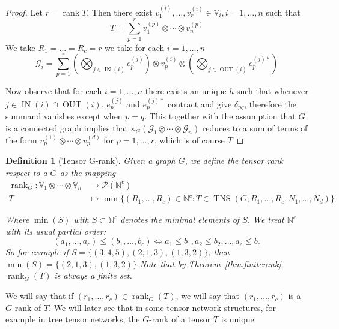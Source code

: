 \documentclass[11pt,a4paper,openright,oneside]{book}
\numberwithin{equation}{section}
\newtheorem{defn0}{Definition}[chapter]
\newenvironment{definition}{ \begin{defn0}}{\end{defn0}}
\newcommand{\thmref}[1]{Theorem~\ref{#1}}
\DeclareMathOperator{\rank}{rank}
\DeclareMathOperator{\IN}{IN}
\DeclareMathOperator{\OUT}{OUT}
\DeclareMathOperator{\TNS}{TNS}
\begin{document}
\begin{proof} Let $r = \rank{T}$. Then there exist $v_1^{(i)}, \dots, v_r^{(i)} \in \mathbb{V}_i, i = 1, \dots, n$ such that
    $$T = \sum_{p=1}^r v_1^{(p)} \otimes \cdots \otimes v_n^{(p)}$$
    We take $R_1 = \dots = R_c = r$ we take for each $i = 1, \dots, n$
    $$\mathcal{G}_i = \sum_{p=1}^r \left( \bigotimes\nolimits_{j \in \IN(i)} e_p^{(j)} \right) \otimes v_p^{(i)} \otimes 
    \left( \bigotimes\nolimits_{j \in \OUT(i)} e_p^{(j)*} \right)$$

    Now observe that for each $i = 1, \dots, n$ there exists an unique $h$ such that whenever $j \in \IN(i)\cap \OUT(i)$,
    $e_p^{(j)}$ and $e_p^{(j)*}$ contract and give $\delta_{pq}$, therefore the summand vanishes except when $p = q$.
    This together with the assumption that $G$ is a connected graph implies that $\kappa_G(\mathcal{G}_1 \otimes \cdots \otimes \mathcal{G}_n)$ reduces
    to a sum of terms of the form $v_p^{(1)} \otimes \cdots \otimes v_p^{(d)}$ for $p = 1, \dots, r$, which is of course $T$
\end{proof}



\begin{definition} [Tensor G-rank]
    Given a graph $G$, we define the tensor rank respect to a $G$ as the mapping
    $$ \begin{align}
        \rank_G : \mathbb{V}_1 \otimes \cdots \otimes \mathbb{V}_n & \longrightarrow \mathcal{P}(\mathbb{N}^c)  \\ 
        T &\longmapsto \min {\{(R_1, \dots, R_c) \in \mathbb{N}^c : T \in \TNS(G; R_1, \dots, R_c, N_1, \dots, N_d)\}}
    \end{align}$$
 
    Where $\min(S)$ with $S \subset \mathbb{N}^c$ denotes the minimal elements of $S$. We treat $\mathbb{N}^c$ with its usual
    partial order:
    $$ (a_1, \dots, a_c) \leqslant (b_1, \dots, b_c) \Longleftrightarrow a_1 \leqslant b_1, a_2 \leqslant b_2, \dots, a_c \leqslant b_c$$
    So for example if $S = \{(3,4,5), (2,1,3), (1,3,2)\}$, then $\min(S) = \{(2,1,3), (1,3,2)\}$ Note that by \thmref{thm:finiterank} $\rank_G(T)$ is always a finite set.
\end{definition}

We will say that if $(r_1, \dots, r_c) \in \rank_G(T)$, we will say that $(r_1, \dots, r_c)$ is a $G$-rank of $T$. We will later see
that in some tensor network structures, for example in tree tensor networks, the $G$-rank of a tensor $T$ is unique
\end{document}
